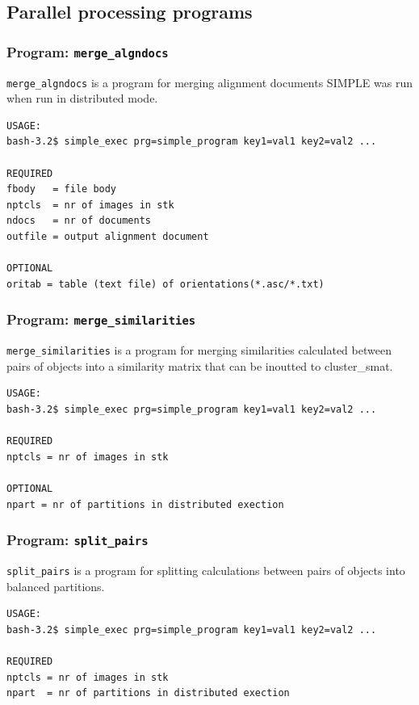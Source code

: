 \documentclass[a4paper,11pt]{article}
\newcommand{\prgname}[1]{\textcolor{NavyBlue}{\texttt{#1}}}
\begin{document}
\subsection{Parallel processing programs}

\subsubsection{Program: \prgname{merge\_algndocs}}
\label{merge_algndocs}
\prgname{merge\_algndocs} is a program for merging alignment documents SIMPLE was run when run in distributed mode.

\begin{verbatim}
USAGE:
bash-3.2$ simple_exec prg=simple_program key1=val1 key2=val2 ...

REQUIRED
fbody   = file body
nptcls  = nr of images in stk
ndocs   = nr of documents
outfile = output alignment document

OPTIONAL
oritab = table (text file) of orientations(*.asc/*.txt)
\end{verbatim}

\subsubsection{Program: \prgname{merge\_similarities}}
\label{merge_similarities}
\prgname{merge\_similarities} is a program for merging similarities calculated between pairs of objects into a similarity matrix that can be inoutted to cluster\_smat.

\begin{verbatim}
USAGE:
bash-3.2$ simple_exec prg=simple_program key1=val1 key2=val2 ...

REQUIRED
nptcls = nr of images in stk

OPTIONAL
npart = nr of partitions in distributed exection
\end{verbatim}

\subsubsection{Program: \prgname{split\_pairs}}
\label{split_pairs}
\prgname{split\_pairs} is a program for splitting calculations between pairs of objects into balanced partitions.

\begin{verbatim}
USAGE:
bash-3.2$ simple_exec prg=simple_program key1=val1 key2=val2 ...

REQUIRED
nptcls = nr of images in stk
npart  = nr of partitions in distributed exection
\end{verbatim}
\end{document}
